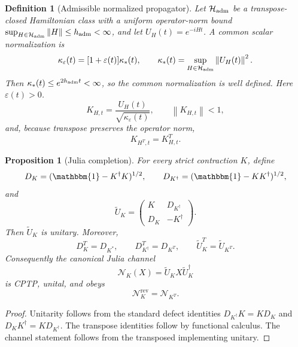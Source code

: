 \documentclass[reprint,amsmath,amssymb,aps,nofootinbib]{revtex4-2}
\newtheorem{definition}{Definition}
\newtheorem{proposition}{Proposition}
\newcommand{\id}{\mathbbm{1}}
\newcommand{\rev}{\mathrm{rev}}
\newcommand{\norm}[1]{\left\lVert #1\right\rVert}
\begin{document}
\begin{definition}[Admissible normalized propagator]
Let $\mathcal H_{\rm adm}$ be a transpose-closed Hamiltonian class with a uniform operator-norm bound
$\sup_{H\in\mathcal H_{\rm adm}}\norm{H}\le h_{\rm adm}<\infty$, and let
$U_H(t)=e^{-iHt}$. A common scalar normalization is
\begin{equation}
\kappa_\varepsilon(t)=[1+\varepsilon(t)]\kappa_*(t),\qquad
\kappa_*(t)=\sup_{H\in\mathcal H_{\rm adm}}\norm{U_H(t)}^2.
\end{equation}
Then $\kappa_*(t)\le e^{2h_{\rm adm}t}<\infty$, so the common normalization is well defined. Here $\varepsilon(t)>0$.
\begin{equation}
K_{H,t}=\frac{U_H(t)}{\sqrt{\kappa_\varepsilon(t)}},
\qquad
\norm{K_{H,t}}<1,
\end{equation}
and, because transpose preserves the operator norm,
\begin{equation}
K_{H^T,t}=K_{H,t}^T.
\end{equation}
\end{definition}

\begin{proposition}[Julia completion]
For every strict contraction $K$, define
\begin{equation}
D_K=(\id-K^\dagger K)^{1/2},\qquad
D_{K^\dagger}=(\id-KK^\dagger)^{1/2},
\end{equation}
and
\begin{equation}
\boxed{
\widetilde U_K=
\begin{pmatrix}
K&D_{K^\dagger}\\
D_K&-K^\dagger
\end{pmatrix}.}
\end{equation}
Then $\widetilde U_K$ is unitary. Moreover,
\begin{equation}
\boxed{
D_K^T=D_{K^*},\qquad D_{K^\dagger}^T=D_{K^T},\qquad
\widetilde U_K^T=\widetilde U_{K^T}.}
\end{equation}
Consequently the canonical Julia channel
\begin{equation}
\mathcal N_K(X)=\widetilde U_KX\widetilde U_K^\dagger
\end{equation}
is CPTP, unital, and obeys
\begin{equation}
\boxed{\mathcal N_K^{\rev}=\mathcal N_{K^T}.}
\end{equation}
\end{proposition}

\begin{proof}
Unitarity follows from the standard defect identities
$D_{K^\dagger}K=KD_K$ and
$D_KK^\dagger=KD_{K^\dagger}$. The transpose identities follow by functional calculus.
The channel statement follows from the transposed implementing unitary.
\end{proof}
\end{document}
